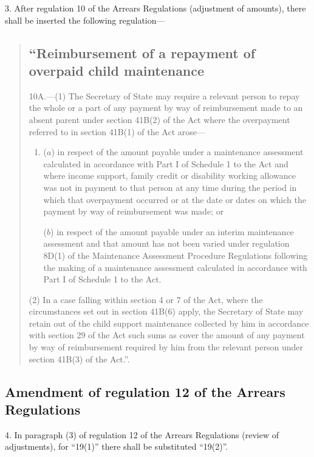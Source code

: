 \documentclass[12pt,a4paper]{article}
\begin{document}
3.  After regulation 10 of the Arrears Regulations (adjustment of amounts), there shall be inserted the following regulation—
\begin{quotation}
\subsection*{\sloppy “Reimbursement of a repayment of overpaid child maintenance}

10A.—(1) The Secretary of State may require a relevant person to repay the whole or a part of any payment by way of reimbursement made to an absent parent under section 41B(2) of the Act where the overpayment referred to in section 41B(1) of the Act arose—
\begin{enumerate}\item[]
($a$) in respect of the amount payable under a maintenance assessment calculated in accordance with Part I of Schedule 1 to the Act and where income support, family credit or disability working allowance was not in payment to that person at any time during the period in which that overpayment occurred or at the date or dates on which the payment by way of reimbursement was made; or

($b$) in respect of the amount payable under an interim maintenance assessment and that amount has not been varied under regulation 8D(1) of the Maintenance Assessment Procedure Regulations following the making of a maintenance assessment calculated in accordance with Part I of Schedule 1 to the Act.
\end{enumerate}

(2) In a case falling within section 4 or 7 of the Act, where the circumstances set out in section 41B(6) apply, the Secretary of State may retain out of the child support maintenance collected by him in accordance with section 29 of the Act such sums as cover the amount of any payment by way of reimbursement required by him from the relevant person under section 41B(3) of the Act.”.
\end{quotation}

\subsection[4. Amendment of regulation 12 of the Arrears Regulations]{Amendment of regulation 12 of the Arrears Regulations}

4.  In paragraph (3) of regulation 12 of the Arrears Regulations (review of adjustments), for “19(1)” there shall be substituted “19(2)”.
\end{document}
